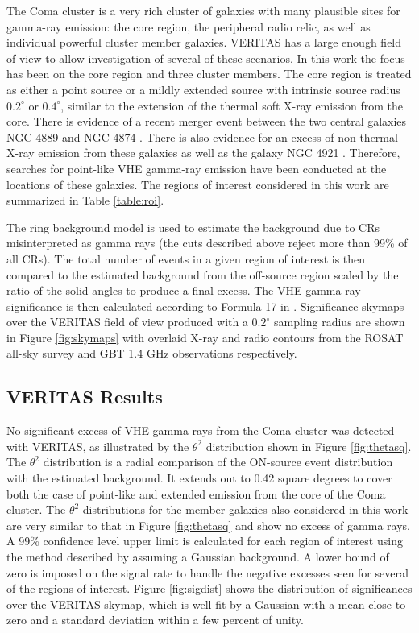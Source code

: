 \documentclass[12pt,manuscript]{aastex}
\begin{document}
The Coma cluster is a very rich cluster of galaxies with many plausible sites for gamma-ray
emission: the core region, the peripheral radio relic, as well as individual powerful cluster
member galaxies. VERITAS has a large enough field of view to allow investigation of several of
these scenarios. In this work the focus has been on the core region and three cluster members. The
core region is treated as either a point
source or a mildly extended source with intrinsic source radius $0.2^{\circ}$ or $0.4^{\circ}$,
similar to the extension of the thermal soft X-ray emission from the core. There
is evidence of a recent merger event between the two central galaxies NGC 4889 and NGC 4874
\citep{article:Tribble:1993}. There is also evidence for an excess of non-thermal X-ray emission
from these galaxies as well as the galaxy NGC 4921 \citep{article:Neumann_etal:2003}. Therefore,
searches for point-like VHE gamma-ray emission have been conducted at the locations of these
galaxies. The regions of interest considered in this work are summarized in Table \ref{table:roi}.

The ring background model \citep{article:Aharonian_etal:2001} is used to estimate the background
due to CRs misinterpreted as gamma rays (the cuts described above reject more than 99\% of all
CRs). The total number of events in a given region of interest is then compared to the estimated
background from the off-source region scaled by the ratio of the solid angles to produce a final
excess. The VHE gamma-ray significance is then calculated according to Formula 17 in
\citet{article:LiMa:1983}. Significance skymaps over the VERITAS field of view produced with a
$0.2^{\circ}$ sampling radius are shown in Figure \ref{fig:skymaps} with overlaid X-ray and radio
contours from the ROSAT all-sky survey \citep{article:BrielHenryBohringer:1992}  and GBT 1.4 GHz
observations \citep{article:BrownRudnick:2010} respectively.

%
%

\subsection{VERITAS Results}
No significant excess of VHE gamma-rays from the Coma cluster was detected with VERITAS, as
illustrated by the $\theta^{2}$ distribution shown in Figure \ref{fig:thetasq}. The $\theta^{2}$
distribution is a radial comparison of the ON-source event distribution with the estimated
background. It extends out to 0.42 square degrees to cover both the case of point-like and extended
emission from the core of the Coma cluster. The $\theta^{2}$ distributions for the member galaxies
also considered in this work are very similar to that in Figure \ref{fig:thetasq} and show no
excess of gamma rays. A 99\% confidence level upper limit is calculated for each region of
interest using the method described by \citet{article:Rolke_etal:2005} assuming a Gaussian
background. A lower bound of zero is imposed on the signal rate to handle the negative excesses
seen for several of the regions of interest. Figure \ref{fig:sigdist} shows the distribution of
significances over the VERITAS skymap, which is well fit by a Gaussian with a mean close to zero and
a standard deviation within a few percent of unity.
\end{document}
